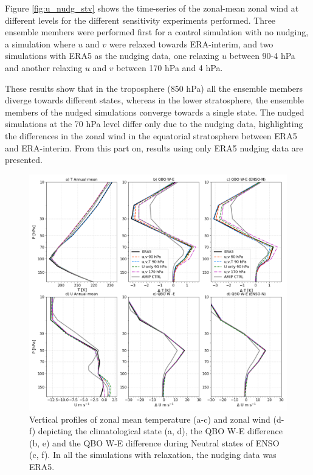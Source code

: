 Figure \ref{fig:u_nudg_stv} shows the time-series of the zonal-mean zonal wind at different levels for the different sensitivity experiments performed. Three ensemble members were performed first for a control simulation with no nudging, a simulation where $u$ and $v$ were relaxed towards ERA-interim, and two simulations with ERA5 as the nudging data, one relaxing $u$ between 90-4 hPa and another relaxing $u$ and $v$ between 170 hPa and 4 hPa.


These results show that in the troposphere (850 hPa) all the ensemble members diverge towards different states, whereas in the lower stratosphere, the ensemble members of the nudged simulations converge towards a single state. The nudged simulations at the 70 hPa level differ only due to the nudging data, highlighting the differences in the zonal wind in the equatorial stratosphere between ERA5 and ERA-interim. 
From this part on, results using only ERA5 nudging data are presented. 

\begin{figure}[t!]
\centering
 \includegraphics[width=\linewidth]{figures/profilUTclimatology.png}
\caption[Nudging sensitivity QBO profiles]{Vertical profiles of zonal mean temperature (a-c) and zonal wind (d-f) depicting the climatological state (a, d), the QBO W-E difference (b, e) and the QBO W-E difference during Neutral states of ENSO (c, f). In all the simulations with relaxation, the nudging data was ERA5.}
\label{fig:prof_nudg}
\end{figure}

